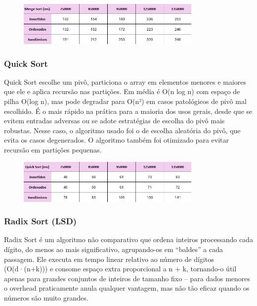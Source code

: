 \documentclass[a4paper, 12pt]{article}
\begin{document}
            \begin{figure}[h]
                \centering
                \includegraphics[width=0.8\textwidth]{images/merge.png}
            \end{figure}

        \subsubsection{Quick Sort}
            Quick Sort escolhe um pivô, particiona o array em elementos menores e maiores que ele e aplica recursão nas partições. Em média é O(n log n) com espaço de pilha O(log n), mas pode degradar para O(n²) em casos patológicos de pivô mal escolhido. É o mais rápido na prática para a maioria dos usos gerais, desde que se evitem entradas adversas ou se adote estratégias de escolha do pivô mais robustas. Nesse caso, o algoritmo usado foi o de escolha aleatória do pivô, que evita os casos degenerados. O algoritmo também foi otimizado para evitar recursão em partições pequenas.

            \begin{figure}[ht]
                \centering
                \includegraphics[width=0.8\textwidth]{images/quick.png}
            \end{figure}

        \subsubsection{Radix Sort (LSD)}
            Radix Sort é um algoritmo não comparativo que ordena inteiros processando cada dígito, do menos ao mais significativo, agrupando-os em “baldes” a cada passagem. Ele executa em tempo linear relativo ao número de dígitos (O(d·(n+k))) e consome espaço extra proporcional a n + k, tornando-o útil apenas para grandes conjuntos de inteiros de tamanho fixo – para dados menores o overhead praticamente anula qualquer vantagem, mas não tão eficaz quando os números são muito grandes.
\end{document}
